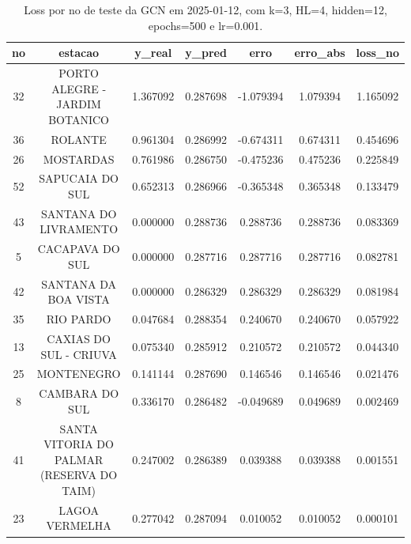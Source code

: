 \begin{table}[h]
\centering
\caption{Loss por no de teste da GCN em 2025-01-12, com k=3, HL=4, hidden=12, epochs=500 e lr=0.001.}
\label{tab:gcn_loss_k3_hl4_h12_e500_d20250112}
\begin{tabular}{ccccccc}
\toprule
no & estacao & y\_real & y\_pred & erro & erro\_abs & loss\_no \\
\midrule
32 & PORTO ALEGRE - JARDIM BOTANICO & 1.367092 & 0.287698 & -1.079394 & 1.079394 & 1.165092 \\
36 & ROLANTE & 0.961304 & 0.286992 & -0.674311 & 0.674311 & 0.454696 \\
26 & MOSTARDAS & 0.761986 & 0.286750 & -0.475236 & 0.475236 & 0.225849 \\
52 & SAPUCAIA DO SUL & 0.652313 & 0.286966 & -0.365348 & 0.365348 & 0.133479 \\
43 & SANTANA DO LIVRAMENTO & 0.000000 & 0.288736 & 0.288736 & 0.288736 & 0.083369 \\
5 & CACAPAVA DO SUL & 0.000000 & 0.287716 & 0.287716 & 0.287716 & 0.082781 \\
42 & SANTANA DA BOA VISTA & 0.000000 & 0.286329 & 0.286329 & 0.286329 & 0.081984 \\
35 & RIO PARDO & 0.047684 & 0.288354 & 0.240670 & 0.240670 & 0.057922 \\
13 & CAXIAS DO SUL - CRIUVA & 0.075340 & 0.285912 & 0.210572 & 0.210572 & 0.044340 \\
25 & MONTENEGRO & 0.141144 & 0.287690 & 0.146546 & 0.146546 & 0.021476 \\
8 & CAMBARA DO SUL & 0.336170 & 0.286482 & -0.049689 & 0.049689 & 0.002469 \\
41 & SANTA VITORIA DO PALMAR (RESERVA DO TAIM) & 0.247002 & 0.286389 & 0.039388 & 0.039388 & 0.001551 \\
23 & LAGOA VERMELHA & 0.277042 & 0.287094 & 0.010052 & 0.010052 & 0.000101 \\
\bottomrule
\end{tabular}
\end{table}
